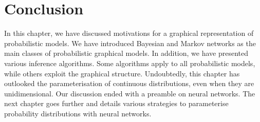 \section{Conclusion}
In this chapter, we have discussed motivations for a graphical representation of probabilistic models.
We have introduced Bayesian and Markov networks as the main classes of probabilistic graphical models. In addition, we have presented various inference algorithms. Some algorithms apply to all probabilistic models, while others exploit the graphical structure. Undoubtedly, this chapter has outlooked the parameterisation of continuous distributions, even when they are unidimensional. Our discussion ended with a preamble on neural networks. The next chapter goes further and details various strategies to parameterise probability distributions with neural networks.


%
%
%


%
%
